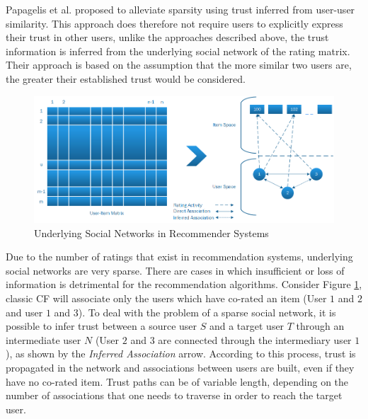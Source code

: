 



Papagelis et al. \cite{Papagelis2005} proposed to alleviate sparsity using
trust inferred from user-user similarity. This approach does therefore not
require users to explicitly express their trust in other users, unlike the
approaches described above, the trust information is inferred from the
underlying social network of the rating matrix. Their approach is based on the
assumption that the more similar two users are, the greater their established
trust would be considered.

\begin{figure}[H]
    \includegraphics[width=5in]{image/trustnetwork.png}
    \centering
    \caption[Underlying Social Networks in Recommender Systems]{Underlying Social Networks in Recommender Systems}
    \label{figure:cfsocialnetwork}
\end{figure}

Due to the number of ratings that exist in recommendation systems, underlying
social networks are very sparse. There are cases in which insufficient or loss
of information is detrimental for the recommendation algorithms. Consider
Figure \ref{figure:cfsocialnetwork}, classic CF will associate only the users
which have co-rated an item (User $1$ and $2$ and user $1$ and $3$). To deal
with the problem of a sparse social network, it is possible to infer trust
between a source user $S$ and a target user $T$ through an intermediate user
$N$ (User $2$ and $3$ are connected through the intermediary user $1$), as
shown by the \emph{Inferred Association} arrow. According to this process,
trust is propagated in the network and associations between users are built,
even if they have no co-rated item. Trust paths can be of variable length,
depending on the number of associations that one needs to traverse in order to
reach the target user.

